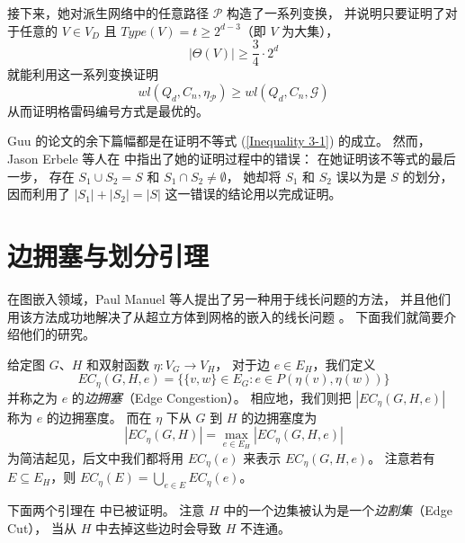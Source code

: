 接下来，她对派生网络中的任意路径 $\mathcal{P}$ 构造了一系列变换，
并说明只要证明了对于任意的 $V \in V_D$ 且 $Type(V) = t \ge 2^{d - 3}$（即 $V$ 为大集），
\begin{equation}
\label{Inequality 3-1}
|\Theta(V)| \ge \frac{3}{4} \cdot 2^d
\end{equation}
就能利用这一系列变换证明
\begin{equation}
wl(Q_d, C_n, \eta_\mathcal{P}) \ge wl(Q_d, C_n, \mathcal{G})
\end{equation}
从而证明格雷码编号方式是最优的。

Guu 的论文的余下篇幅都是在证明不等式 (\ref{Inequality 3-1}) 的成立。
然而，Jason Erbele 等人在 \cite{Erbele.2003} 中指出了她的证明过程中的错误：
在她证明该不等式的最后一步，
存在 $S_1 \cup S_2 = S$ 和 $S_1 \cap S_2 \neq \emptyset$，
她却将 $S_1$ 和 $S_2$ 误以为是 $S$ 的划分，
因而利用了 $|S_1| + |S_2| = |S|$ 这一错误的结论用以完成证明。

\section{边拥塞与划分引理}
\label{Section 3.3}

在图嵌入领域，Paul Manuel 等人提出了另一种用于线长问题的方法，
并且他们用该方法成功地解决了从超立方体到网格的嵌入的线长问题 \cite{Manuel.2009}。
下面我们就简要介绍他们的研究。

给定图 $G$、$H$ 和双射函数 $\eta \colon V_G \rightarrow V_H$，
对于边 $e \in E_H$，我们定义
\begin{equation}
EC_\eta(G, H, e) = \{\{v, w\} \in E_G \colon e \in P(\eta(v), \eta(w))\}
\end{equation}
并称之为 $e$ 的\emph{边拥塞}（Edge Congestion）。
相应地，我们则把 $|EC_\eta(G, H, e)|$ 称为 $e$ 的边拥塞度。
而在 $\eta$ 下从 $G$ 到 $H$ 的边拥塞度为
\begin{equation}
|EC_\eta(G, H)| = \max_{e \in E_H} |EC_\eta(G, H, e)|
\end{equation}
为简洁起见，后文中我们都将用 $EC_\eta(e)$ 来表示 $EC_\eta(G, H, e)$。
注意若有 $E \subseteq E_H$，则 $EC_\eta(E) = \bigcup_{e \in E} EC_\eta(e)$。

下面两个引理在 \cite{Manuel.2009} 中已被证明。
注意 $H$ 中的一个边集被认为是一个\emph{边割集}（Edge Cut），
当从 $H$ 中去掉这些边时会导致 $H$ 不连通。

